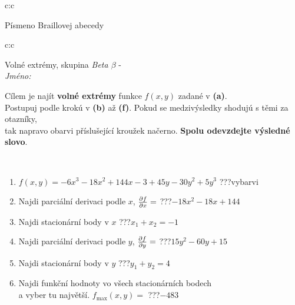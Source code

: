 \documentclass[10pt]{report}
\begin{document}
\begin{tabular}{c:c}
\begin{minipage}[c][104.5mm][t]{0.5\linewidth}
\begin{center}
\begin{minipage}{0.20\linewidth}
\begin{center}
{\small Písmeno Braillovej abecedy}
\end{center}
\end{minipage}
\end{center}
\end{minipage}
%
\end{tabular}
\newpage
\thispagestyle{empty}
\begin{tabular}{c:c}
\begin{minipage}[c][104.5mm][t]{0.5\linewidth}
\begin{center}
\vspace{7mm}
{\huge Volné extrémy, skupina \textit{Beta $\beta$} -}\\[5mm]
\textit{Jméno:}\phantom{xxxxxxxxxxxxxxxxxxxxxxxxxxxxxxxxxxxxxxxxxxxxxxxxxxxxxxxxxxxxxxxxx}\\[5mm]
\begin{minipage}{0.95\linewidth}
\begin{center}
Cílem je najít \textbf{volné extrémy} funkce $f(x,y)$ zadané v \textbf{(a)}.\\Postupuj podle krokú v \textbf{(b)} až \textbf{(f)}. Pokud se medzivýsledky shodujú s těmi za otazníky,\\tak napravo obarvi příslušející kroužek načerno. \textbf{Spolu odevzdejte výsledné slovo}.
\end{center}
\end{minipage}
\\[1mm]
\begin{minipage}{0.79\linewidth}
\begin{center}
\begin{varwidth}{\linewidth}
\begin{enumerate}
\normalsize
\item $f(x,y)=-6x^3-18x^2+144x-3+45y-30y^2+5y^3$\quad \dotfill\; ???\;\dotfill \quad vybarvi
\item Najdi parciální derivaci podle $x$, $\pdv{f}{x}=$\quad \dotfill\; ???\;\dotfill \quad $-18x^2-18x+144$
\item Najdi stacionární body v $x$\quad \dotfill\; ???\;\dotfill \quad $x_1+x_2=-1$
\item Najdi parciální derivaci podle $y$, $\pdv{f}{y}=$\quad \dotfill\; ???\;\dotfill \quad $15y^2-60y+15$
\item Najdi stacionární body v $y$\quad \dotfill\; ???\;\dotfill \quad $y_1+y_2=4$
\item Najdi funkční hodnoty vo všech stacionárních bodech \\ \phantom{xxxxxx} a vyber tu najvětší. $f_{\text{max}}(x,y)=$\quad \dotfill\; ???\;\dotfill \quad $-483$

\end{enumerate}
\end{varwidth}
\end{center}
\end{minipage}
\end{center}
\end{minipage}
\end{tabular}
\end{document}
